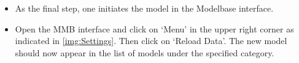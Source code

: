 \begin{itemize}
\item As the final step, one initiates the model in the Modelbase interface.
\item Open the MMB interface and click on `Menu' in the upper right corner as indicated in \ref{img:Settings}. Then click on `Reload Data'. The new model should now appear in the list of models under the specified category.
\end{itemize}

